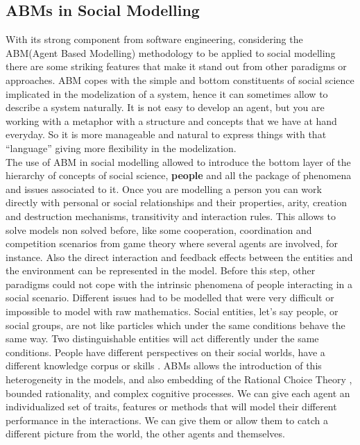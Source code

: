 \documentclass[11pt,oneside,a4paper,openright]{report}
\begin{document}
\subsection{ABMs in Social Modelling}
With its strong component from software engineering, considering the ABM(Agent Based Modelling) methodology to be applied to social modelling there are some striking features that make it stand out from other paradigms or approaches. ABM copes with the simple and bottom constituents of social science implicated in the modelization of a system, hence it can sometimes allow to describe a system naturally. It is not easy to develop an agent, but you are working with a metaphor  with a structure and concepts that we have at hand everyday. So it is more manageable and natural to express things with that “language” giving more flexibility in the modelization.\\ 
The use of ABM in social modelling allowed to introduce the bottom layer of the hierarchy of concepts of social science, \textbf{people} and all the package of phenomena and issues associated to it. Once you are modelling a person you can work directly with personal or social relationships and their properties, arity, creation and destruction mechanisms, transitivity and interaction rules. This allows to solve models non solved before, like some cooperation, coordination and competition scenarios from game theory where several agents are involved, for instance. Also the direct interaction and feedback effects between the entities and the environment can be represented in the model. Before this step, other paradigms could not cope with the intrinsic phenomena of people interacting in a social scenario. Different issues had to be modelled that were very difficult or impossible to model with raw mathematics.
Social entities, let's say people, or social groups, are not like particles which under the same conditions behave the same way. Two distinguishable entities will act differently under the same conditions. People have different perspectives on their social worlds, have a different knowledge corpus or skills \cite[p.19]{GilbertTroitzsch}. ABMs allows the introduction of this heterogeneity in the models, and also embedding of the Rational Choice Theory \cite{Scott2000}, bounded rationality, and complex cognitive processes. We can give each agent an individualized set of traits, features or methods that will model their different performance in the interactions. We can give them or allow them to catch a different picture from the world, the other agents and themselves.\\ 
\end{document}
